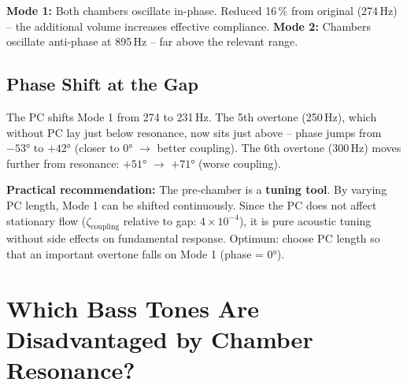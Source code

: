 \documentclass[11pt,a4paper]{article}
\begin{document}
\textbf{Mode 1:} Both chambers oscillate in-phase. Reduced 16\,\% from original (274\,Hz) -- the additional volume increases effective compliance. \textbf{Mode 2:} Chambers oscillate anti-phase at 895\,Hz -- far above the relevant range.

\subsection{Phase Shift at the Gap}

\begin{table}[H]
\centering\small
{}
\caption{Phase of chamber impedance at slot, with and without pre-chamber ($Q_H \approx 7$)}
\end{table}

The PC shifts Mode 1 from 274 to 231\,Hz. The 5th overtone (250\,Hz), which without PC lay just below resonance, now sits just above -- phase jumps from $-53°$ to $+42°$ (closer to 0° $\to$ better coupling). The 6th overtone (300\,Hz) moves further from resonance: $+51°$ $\to$ $+71°$ (worse coupling).

\begin{keybox}
\textbf{Practical recommendation:} The pre-chamber is a \textbf{tuning tool}. By varying PC length, Mode 1 can be shifted continuously. Since the PC does not affect stationary flow ($\zeta_\text{coupling}$ relative to gap: $4 \times 10^{-4}$), it is pure acoustic tuning without side effects on fundamental response. Optimum: choose PC length so that an important overtone falls on Mode 1 (phase = 0°).
\end{keybox}

\section{Which Bass Tones Are Disadvantaged by Chamber Resonance?}
\end{document}
